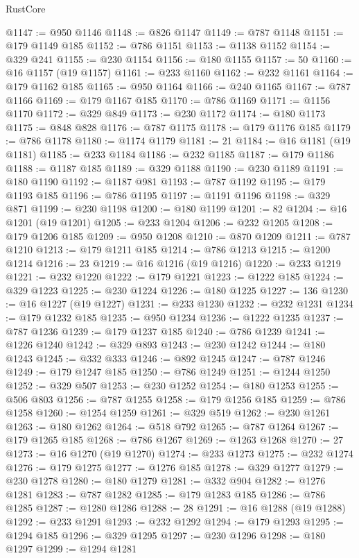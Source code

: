 \begin{lexlean}{RustCore}
\begin{coremodule}
@1147 := @950 @1146
@1148 := @826 @1147
@1149 := @787 @1148
@1151 := @179 @1149 @185
@1152 := @786 @1151
@1153 := @1138 @1152
@1154 := @329 @241
@1155 := @230 @1154
@1156 := @180 @1155
@1157 := 50
@1160 := @16 @1157 (@19 @1157)
@1161 := @233 @1160
@1162 := @232 @1161
@1164 := @179 @1162 @185
@1165 := @950 @1164
@1166 := @240 @1165
@1167 := @787 @1166
@1169 := @179 @1167 @185
@1170 := @786 @1169
@1171 := @1156 @1170
@1172 := @329 @849
@1173 := @230 @1172
@1174 := @180 @1173
@1175 := @848 @828
@1176 := @787 @1175
@1178 := @179 @1176 @185
@1179 := @786 @1178
@1180 := @1174 @1179
@1181 := 21
@1184 := @16 @1181 (@19 @1181)
@1185 := @233 @1184
@1186 := @232 @1185
@1187 := @179 @1186
@1188 := @1187 @185
@1189 := @329 @1188
@1190 := @230 @1189
@1191 := @180 @1190
@1192 := @1187 @981
@1193 := @787 @1192
@1195 := @179 @1193 @185
@1196 := @786 @1195
@1197 := @1191 @1196
@1198 := @329 @871
@1199 := @230 @1198
@1200 := @180 @1199
@1201 := 82
@1204 := @16 @1201 (@19 @1201)
@1205 := @233 @1204
@1206 := @232 @1205
@1208 := @179 @1206 @185
@1209 := @950 @1208
@1210 := @870 @1209
@1211 := @787 @1210
@1213 := @179 @1211 @185
@1214 := @786 @1213
@1215 := @1200 @1214
@1216 := 23
@1219 := @16 @1216 (@19 @1216)
@1220 := @233 @1219
@1221 := @232 @1220
@1222 := @179 @1221
@1223 := @1222 @185
@1224 := @329 @1223
@1225 := @230 @1224
@1226 := @180 @1225
@1227 := 136
@1230 := @16 @1227 (@19 @1227)
@1231 := @233 @1230
@1232 := @232 @1231
@1234 := @179 @1232 @185
@1235 := @950 @1234
@1236 := @1222 @1235
@1237 := @787 @1236
@1239 := @179 @1237 @185
@1240 := @786 @1239
@1241 := @1226 @1240
@1242 := @329 @893
@1243 := @230 @1242
@1244 := @180 @1243
@1245 := @332 @333
@1246 := @892 @1245
@1247 := @787 @1246
@1249 := @179 @1247 @185
@1250 := @786 @1249
@1251 := @1244 @1250
@1252 := @329 @507
@1253 := @230 @1252
@1254 := @180 @1253
@1255 := @506 @803
@1256 := @787 @1255
@1258 := @179 @1256 @185
@1259 := @786 @1258
@1260 := @1254 @1259
@1261 := @329 @519
@1262 := @230 @1261
@1263 := @180 @1262
@1264 := @518 @792
@1265 := @787 @1264
@1267 := @179 @1265 @185
@1268 := @786 @1267
@1269 := @1263 @1268
@1270 := 27
@1273 := @16 @1270 (@19 @1270)
@1274 := @233 @1273
@1275 := @232 @1274
@1276 := @179 @1275
@1277 := @1276 @185
@1278 := @329 @1277
@1279 := @230 @1278
@1280 := @180 @1279
@1281 := @332 @904
@1282 := @1276 @1281
@1283 := @787 @1282
@1285 := @179 @1283 @185
@1286 := @786 @1285
@1287 := @1280 @1286
@1288 := 28
@1291 := @16 @1288 (@19 @1288)
@1292 := @233 @1291
@1293 := @232 @1292
@1294 := @179 @1293
@1295 := @1294 @185
@1296 := @329 @1295
@1297 := @230 @1296
@1298 := @180 @1297
@1299 := @1294 @1281

\end{coremodule}
\end{lexlean}
